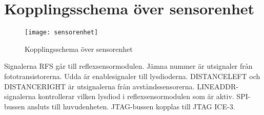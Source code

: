 \section{Kopplingsschema över sensorenhet}

\begin{figure}[h]
\center
\texttt{[image: sensorenhet]}
\caption{Kopplingsschema över sensorenhet}
\end{figure}

Signalerna RFS går till reflexsensormodulen. Jämna nummer är utsignaler från fototransistorerna. Udda är enablesignaler till lysdioderna. DISTANCELEFT och DISTANCERIGHT är utsignalerna från avståndssensorerna. LINEADDR-signalerna kontrollerar vilken lysdiod i reflexsensormodulen som är aktiv. SPI-bussen ansluts till huvudenheten. JTAG-bussen kopplas till JTAG ICE-3.
